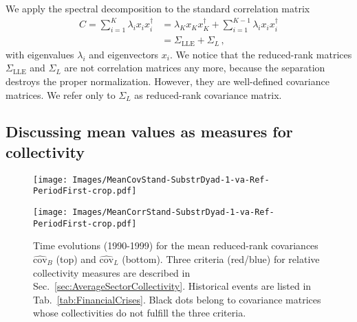 \documentclass[aps, pra, groupedaddress, showkeys, twocolumn, floatfix, 10pt]{revtex4-2}
\newcommand*\meanNONDiag[1]{\widehat{#1}}
\begin{document}
We apply the spectral decomposition to the standard correlation matrix
%
\begin{align} \label{eqn:CorrelationMatSpectralDecomp}
	C = \sum_{i=1}^K \lambda_i x_i x^{\dagger}_i &= \lambda_K x_K x^{\dagger}_K + \sum_{i=1}^{K-1} \lambda_i x_i x^{\dagger}_i   \\
	&= \Sigma_{\text{LLE}} + \Sigma_{L} \,,
\end{align}
%
with eigenvalues $\lambda_i$ and eigenvectors $x_i$.
We notice that the reduced-rank matrices $\Sigma_{\text{LLE}}$
and $\Sigma_L$ are not correlation matrices any more, because the separation destroys the proper normalization. However, they are well-defined covariance matrices.
We refer only to $\Sigma_{L}$ as reduced-rank covariance matrix.


\subsection{\label{sec:DiscussingMeanValuesAsMeasuresForCollectivity}Discussing mean values as measures for collectivity}


%
\begin{figure*}[!htb]
	\centering
	\begin{minipage}{1.0\textwidth}
		\subfloat%
		{\texttt{[image: Images/MeanCovStand-SubstrDyad-1-va-Ref-PeriodFirst-crop.pdf]}
		}\par
		\subfloat%
		{\texttt{[image: Images/MeanCorrStand-SubstrDyad-1-va-Ref-PeriodFirst-crop.pdf]}
		}%
	\end{minipage}%
	\caption{\label{subfig:Main:MeanValCovP1}Time evolutions (1990-1999) for the mean reduced-rank covariances $\meanNONDiag{\text{cov}}_{{B}}$ (top) and $\meanNONDiag{\text{cov}}_{{L}}$ (bottom).
		Three criteria (red/blue) for relative collectivity measures are described in Sec.~\ref{sec:AverageSectorCollectivity}. Historical events are listed in Tab.~\ref{tab:FinancialCrises}. Black dots belong to covariance matrices whose collectivities do not fulfill the three criteria.}
\end{figure*}
%
\end{document}
